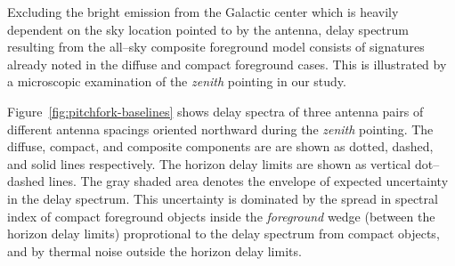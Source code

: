 \documentclass[preprint2,iop,numberedappendix]{emulateapj}
\begin{document}
Excluding the bright emission from the Galactic center which is heavily dependent on the sky location pointed to by the antenna, delay spectrum resulting from the all--sky composite foreground model consists of signatures already noted in the diffuse and compact foreground cases. This is illustrated by a microscopic examination of the {\it zenith} pointing in our study. 

Figure~\ref{fig:pitchfork-baselines} shows delay spectra of three antenna pairs of different antenna spacings oriented northward during the {\it zenith} pointing. The diffuse, compact, and composite components are are shown as dotted, dashed, and solid lines respectively. The horizon delay limits are shown as vertical dot--dashed lines. The gray shaded area denotes the envelope of expected uncertainty in the delay spectrum. This uncertainty is dominated by the spread in spectral index of compact foreground objects inside the {\it foreground} wedge (between the horizon delay limits) proprotional to the delay spectrum from compact objects, and by thermal noise outside the horizon delay limits.
\end{document}
